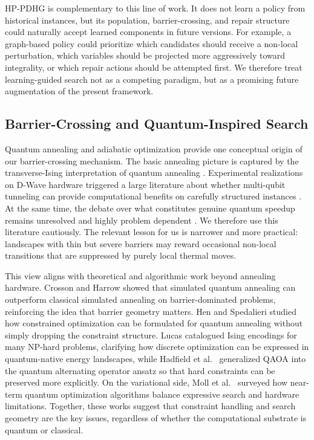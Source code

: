 HP-PDHG is complementary to this line of work. It does not learn a policy from historical instances, but its population, barrier-crossing, and repair structure could naturally accept learned components in future versions. For example, a graph-based policy could prioritize which candidates should receive a non-local perturbation, which variables should be projected more aggressively toward integrality, or which repair actions should be attempted first. We therefore treat learning-guided search not as a competing paradigm, but as a promising future augmentation of the present framework.

\subsection{Barrier-Crossing and Quantum-Inspired Search}

Quantum annealing and adiabatic optimization provide one conceptual origin of our barrier-crossing mechanism. The basic annealing picture is captured by the transverse-Ising interpretation of quantum annealing \cite{kadowaki1998quantum,das2008colloquium}. Experimental realizations on D-Wave hardware triggered a large literature about whether multi-qubit tunneling can provide computational benefits on carefully structured instances \cite{johnson2011quantum,denchev2016computational}. At the same time, the debate over what constitutes genuine quantum speedup remains unresolved and highly problem dependent \cite{ronnow2014defining}. We therefore use this literature cautiously. The relevant lesson for us is narrower and more practical: landscapes with thin but severe barriers may reward occasional non-local transitions that are suppressed by purely local thermal moves.

This view aligns with theoretical and algorithmic work beyond annealing hardware. Crosson and Harrow \cite{crosson2016simulated} showed that simulated quantum annealing can outperform classical simulated annealing on barrier-dominated problems, reinforcing the idea that barrier geometry matters. Hen and Spedalieri \cite{hen2016quantum} studied how constrained optimization can be formulated for quantum annealing without simply dropping the constraint structure. Lucas \cite{lucas2014ising} catalogued Ising encodings for many NP-hard problems, clarifying how discrete optimization can be expressed in quantum-native energy landscapes, while Hadfield et al.~\cite{hadfield2019qaoa} generalized QAOA into the quantum alternating operator ansatz so that hard constraints can be preserved more explicitly. On the variational side, Moll et al.~\cite{moll2018variational} surveyed how near-term quantum optimization algorithms balance expressive search and hardware limitations. Together, these works suggest that constraint handling and search geometry are the key issues, regardless of whether the computational substrate is quantum or classical.

